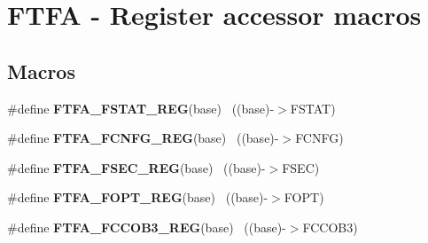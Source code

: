 \hypertarget{group___f_t_f_a___register___accessor___macros}{}\section{F\+T\+F\+A -\/ Register accessor macros}
\label{group___f_t_f_a___register___accessor___macros}
\subsection*{Macros}
\begin{DoxyCompactItemize}
\item 
\hypertarget{group___f_t_f_a___register___accessor___macros_ga4736ffce69a4d6973d823deb6cad1f52}{}\#define {\bfseries F\+T\+F\+A\+\_\+\+F\+S\+T\+A\+T\+\_\+\+R\+E\+G}(base)                                      ~((base)-\/$>$F\+S\+T\+A\+T)\label{group___f_t_f_a___register___accessor___macros_ga4736ffce69a4d6973d823deb6cad1f52}

\item 
\hypertarget{group___f_t_f_a___register___accessor___macros_gacd9acc933e344c7de9bd34f88bd82fc1}{}\#define {\bfseries F\+T\+F\+A\+\_\+\+F\+C\+N\+F\+G\+\_\+\+R\+E\+G}(base)                                      ~((base)-\/$>$F\+C\+N\+F\+G)\label{group___f_t_f_a___register___accessor___macros_gacd9acc933e344c7de9bd34f88bd82fc1}

\item 
\hypertarget{group___f_t_f_a___register___accessor___macros_ga05d271787e423430f534b76acd41234f}{}\#define {\bfseries F\+T\+F\+A\+\_\+\+F\+S\+E\+C\+\_\+\+R\+E\+G}(base)                                        ~((base)-\/$>$F\+S\+E\+C)\label{group___f_t_f_a___register___accessor___macros_ga05d271787e423430f534b76acd41234f}

\item 
\hypertarget{group___f_t_f_a___register___accessor___macros_gaf40941d14954024566aa2bbdf158636a}{}\#define {\bfseries F\+T\+F\+A\+\_\+\+F\+O\+P\+T\+\_\+\+R\+E\+G}(base)                                        ~((base)-\/$>$F\+O\+P\+T)\label{group___f_t_f_a___register___accessor___macros_gaf40941d14954024566aa2bbdf158636a}

\item 
\hypertarget{group___f_t_f_a___register___accessor___macros_ga66adfe5c9b6f0b063463a79fc6aa2b60}{}\#define {\bfseries F\+T\+F\+A\+\_\+\+F\+C\+C\+O\+B3\+\_\+\+R\+E\+G}(base)                                    ~((base)-\/$>$F\+C\+C\+O\+B3)\label{group___f_t_f_a___register___accessor___macros_ga66adfe5c9b6f0b063463a79fc6aa2b60}


\end{DoxyCompactItemize}
